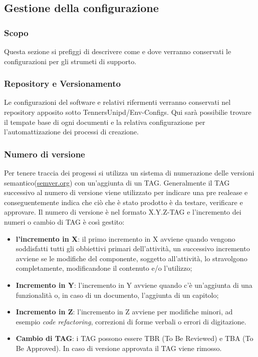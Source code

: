 \subsection{Gestione della configurazione}
\subsubsection{Scopo}
Questa sezione si prefiggi di descrivere come e dove verranno conservati le configurazioni
per gli strumeti di supporto.
\subsubsection{Repository e Versionamento}
Le configurazioni del software e relativi rifermenti verranno conservati nel repository
apposito sotto TennersUnipd/Env-Configs.
Qui sarà possibilie trovare il tempate base di ogni documenti e la relativa configurazione
per l'automattizazione dei processi di creazione.

\subsubsection{Numero di versione}
Per tenere traccia dei progessi si utilizza un sistema di numerazione delle versioni
semantico(\href{https://semver.org/lang/it/}{semver.org}) con un'aggiunta di un TAG.
Generalmente il TAG successivo al numero di versione viene utilizzato per indicare una
pre realease e conseguentemente indica che ciò che è stato prodotto è da testare,
verificare e approvare.
Il numero di versione è nel formato X.Y.Z-TAG e l'incremento dei numeri o cambio
di TAG è così gestito:
\begin{itemize}
  \item \textbf{l'incremento in X}: il primo incremento in X avviene quando vengono
  soddisfatti tutti gli obbiettivi primari dell'attività, un successivo incremento
  avviene se le modifiche del componente, soggetto all'attività, lo stravolgono
  completamente, modificandone il contenuto e/o l'utilizzo;
  \item \textbf{Incremento in Y}: l'incremento in Y avviene quando c'è un'aggiunta
  di una funzionalità o, in caso di un documento, l'aggiunta di un capitolo;
  \item \textbf{Incremento in Z}: l'incremento in Z avviene per modifiche minori,
  ad esempio \textit{code refactoring\glos}, correzioni di forme verbali o errori di digitazione.
  \item \textbf{Cambio di TAG}: i TAG possono essere TBR (To Be Reviewed) e TBA (To Be Approved).
  In caso di versione approvata il TAG viene rimosso.
\end{itemize}

